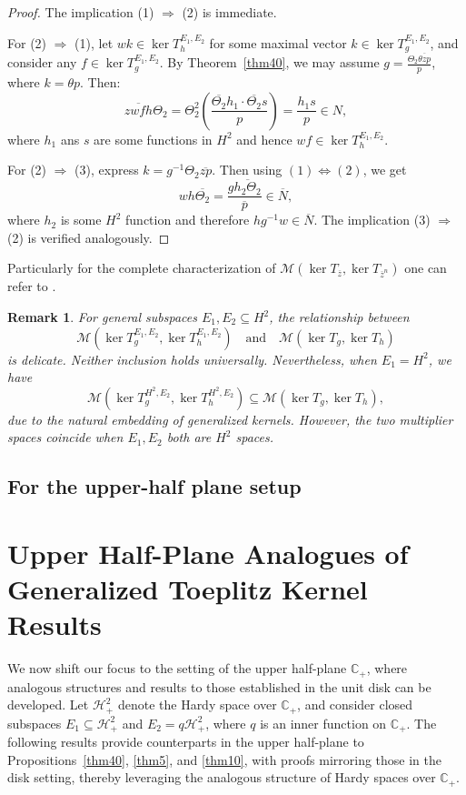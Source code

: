 \documentclass[12pt,a4paper]{amsart}
\newtheorem{remark}{Remark}
\begin{document}
\begin{proof}
The implication (1) \( \Rightarrow \) (2) is immediate.

For (2) \( \Rightarrow \) (1), let \( wk \in \ker T_h^{E_1, E_2} \) for some maximal vector \( k \in \ker T_g^{E_1, E_2} \), and consider any \( f \in \ker T_g^{E_1, E_2} \). By Theorem~\ref{thm40}, we may assume \( g = \frac{\Theta_2 \overline{\theta zp}}{p} \), where $k=\theta p$. Then:
\[
\overline{zwfh} \Theta_2
= \Theta_2^2 \left( \frac{ \overline{\Theta_2} h_1 \cdot \overline{\Theta_2} s }{p} \right)
= \frac{h_1 s}{p} \in N,
\]
where $h_1$ ans $s$ are some functions in $H^2$ and hence \( wf \in \ker T_h^{E_1, E_2} \).

For (2) \( \Rightarrow \) (3), express \( k = g^{-1} \Theta_2 \overline{zp} \). Then using $(1)\Leftrightarrow (2)$, we get
\[
wh \overline{\Theta_2} = \frac{g \overline{h_2 \Theta_2}}{\overline{p}} \in \overline{N},
\]
where $h_2$ is some $H^2$ function and therefore \( hg^{-1}w \in \overline{N} \). The implication (3) \( \Rightarrow \) (2) is verified analogously.
\end{proof}
Particularly for the complete characterization of $\mathcal M(\ker T_{\overline{z}}, \ker T_{\overline{z}^n})$ one can refer to \cite{bhardwaj2024}.
\begin{remark}

For general subspaces \( E_1, E_2 \subseteq H^2 \), the relationship between
  \[
  \mathcal{M}(\ker T_g^{E_1, E_2}, \ker T_h^{E_1, E_2}) \quad \text{and} \quad \mathcal{M}(\ker T_g, \ker T_h)
    \]
    is delicate. Neither inclusion holds universally. Nevertheless, when \( E_1 = H^2 \), we have
    \[
      \mathcal{M}(\ker T_g^{H^2, E_2}, \ker T_h^{H^2, E_2}) \subseteq \mathcal{M}(\ker T_g, \ker T_h),
    \]
    due to the natural embedding of generalized kernels.
    However, the two multiplier spaces coincide when $E_1,E_2$ both are $H^2$ spaces.



\end{remark}



\subsection{For the upper-half plane setup}

\section*{Upper Half-Plane Analogues of Generalized Toeplitz Kernel Results}
We now shift our focus to the setting of the upper half-plane \( \mathbb{C}_+ \), where analogous structures and results to those established in the unit disk can be developed. Let \( \mathcal{H}_+^2 \) denote the Hardy space over \( \mathbb{C}_+ \), and consider closed subspaces \( E_1 \subseteq \mathcal{H}_+^2 \) and \( E_2 = q\mathcal{H}_+^2 \), where \( q \) is an inner function on \( \mathbb{C}_+ \). The following results provide counterparts in the upper half-plane to Propositions~\ref{thm40}, \ref{thm5}, and \ref{thm10}, with proofs mirroring those in the disk setting, thereby leveraging the analogous structure of Hardy spaces over \( \mathbb{C}_+ \).
\end{document}
